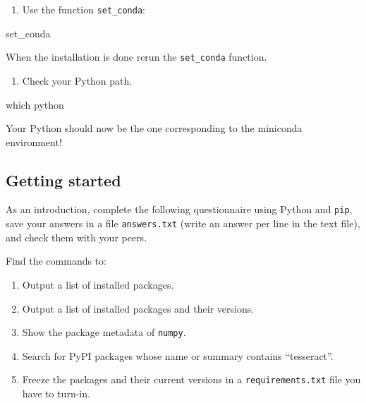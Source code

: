 \documentclass[]{article}
\newenvironment{Shaded}{\begin{snugshade}}{\end{snugshade}}
\newcommand{\NormalTok}[1]{\textcolor[rgb]{0.81,0.81,0.76}{#1}}
\providecommand{\tightlist}{%
  \setlength{\itemsep}{0pt}\setlength{\parskip}{0pt}}
\begin{document}
\begin{enumerate}
\def\labelenumi{\arabic{enumi}.}
\setcounter{enumi}{2}
\tightlist
\item
  Use the function \texttt{set\_conda}:
\end{enumerate}

\begin{Shaded}
\begin{Highlighting}[]
\NormalTok{set_conda}
\end{Highlighting}
\end{Shaded}

When the installation is done rerun the \texttt{set\_conda} function.

\begin{enumerate}
\def\labelenumi{\arabic{enumi}.}
\setcounter{enumi}{3}
\tightlist
\item
  Check your Python path.
\end{enumerate}

\begin{Shaded}
\begin{Highlighting}[]
\NormalTok{which python}
\end{Highlighting}
\end{Shaded}

Your Python should now be the one corresponding to the miniconda
environment!

\hypertarget{getting-started}{%
\subsection{Getting started}\label{getting-started}}

As an introduction, complete the following questionnaire using Python
and \texttt{pip}, save your answers in a file \texttt{answers.txt}
(write an answer per line in the text file), and check them with your
peers.

Find the commands to:

\begin{enumerate}
\def\labelenumi{\arabic{enumi}.}
\item
  Output a list of installed packages.
\item
  Output a list of installed packages and their versions.
\item
  Show the package metadata of \texttt{numpy}.
\item
  Search for PyPI packages whose name or summary contains ``tesseract''.
\item
  Freeze the packages and their current versions in a
  \texttt{requirements.txt} file you have to turn-in.
\end{enumerate}
\end{document}
